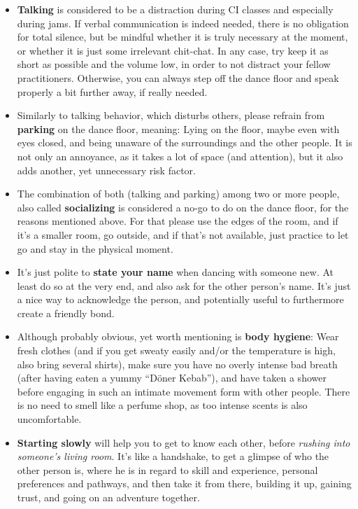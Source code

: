 \begin{itemize}
    \item \textbf{Talking} is considered to be a distraction during CI classes and especially during jams.
    If verbal communication is indeed needed, there is no obligation for total silence, but be mindful whether it is truly necessary at the moment, or whether it is just some irrelevant chit-chat.
    In any case, try keep it as short as possible and the volume low, in order to not distract your fellow practitioners.
    Otherwise, you can always step off the dance floor and speak properly a bit further away, if really needed.
    \item Similarly to talking behavior, which disturbs others, please refrain from \textbf{parking} on the dance floor, meaning: Lying on the floor, maybe even with eyes closed, and being unaware of the surroundings and the other people.
    It is not only an annoyance, as it takes a lot of space (and attention), but it also adds another, yet unnecessary risk factor.
    \item The combination of both (talking and parking) among two or more people, also called \textbf{socializing} is considered a no-go to do on the dance floor, for the reasons mentioned above.
    For that please use the edges of the room, and if it's a smaller room, go outside, and if that's not available, just practice to let go and stay in the physical moment.
    \item It's just polite to \textbf{state your name} when dancing with someone new.
    At least do so at the very end, and also ask for the other person's name.
    It's just a nice way to acknowledge the person, and potentially useful to furthermore create a friendly bond.
    \item Although probably obvious, yet worth mentioning is \textbf{body hygiene}: Wear fresh clothes (and if you get sweaty easily and/or the temperature is high, also bring several shirts), make sure you have no overly intense bad breath (after having eaten a yummy ``Döner Kebab''), and have taken a shower before engaging in such an intimate movement form with other people.
    There is no need to smell like a perfume shop, as too intense scents is also uncomfortable.
    \item \textbf{Starting slowly} will help you to get to know each other, before \textit{rushing into someone's living room}.
    It's like a handshake, to get a glimpse of who the other person is, where he is in regard to skill and experience, personal preferences and pathways, and then take it from there, building it up, gaining trust, and going on an adventure together.

\end{itemize}
